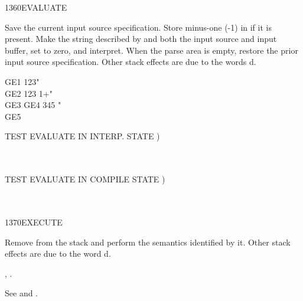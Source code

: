 \begin{worddef}{1360}{EVALUATE}
\item {}

	Save the current input source specification. Store minus-one
	(-1) in  if it is present. Make the string
	described by  and  both the input source
	and input buffer, set  to zero, and interpret. When
	the parse area is empty, restore the prior input source
	specification. Other stack effects are due to the words
	d.

	\begin{testing} %
		\ttfamily
		\word{:} GE1  123" \word{;}  \\
		\word{:} GE2  123 1+" \word{;}  \\
		\word{:} GE3  \word{:} GE4 345 \word{;}" \word{;} \\
		\word{:} GE5  \word{;} 

		  TEST EVALUATE IN INTERP. STATE ) \\
		 \\
		 \\

		  TEST EVALUATE IN COMPILE STATE ) \\
		 \\
		 \\

	\end{testing}
\end{worddef}


\begin{worddef}{1370}{EXECUTE}
\item {}

	Remove  from the stack and perform the semantics
	identified by it. Other stack effects are due to the word
	d.

\see {},
	.

	\begin{testing} %
		See  and .
	\end{testing}
\end{worddef}


